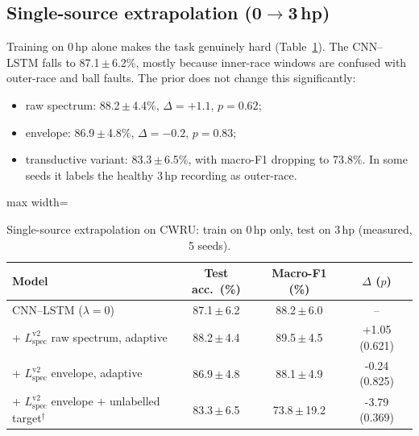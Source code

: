\documentclass[conference]{IEEEtran}
\begin{document}
\subsection{Single-source extrapolation (0$\to$3\,hp)}
Training on 0\,hp alone makes the task genuinely hard
(Table~\ref{tab:single}). The CNN--LSTM falls to 87.1\,$\pm$\,6.2\%, mostly
because inner-race windows are confused with outer-race and ball faults. The
prior does not change this significantly:
\begin{itemize}
\item raw spectrum: 88.2\,$\pm$\,4.4\%, $\Delta=+1.1$, $p=0.62$;
\item envelope: 86.9\,$\pm$\,4.8\%, $\Delta=-0.2$, $p=0.83$;
\item transductive variant: 83.3\,$\pm$\,6.5\%, with macro-F1 dropping to
73.8\%. In some seeds it labels the healthy 3\,hp recording as outer-race.
\end{itemize}

\begin{table}[t]
\caption{Single-source extrapolation on CWRU: train on 0\,hp only, test on 3\,hp (measured, 5 seeds).}
\label{tab:single}
\centering
\footnotesize
\begin{adjustbox}{max width=\columnwidth}
\begin{tabular}{lccc}
\toprule
Model & Test acc.\ (\%) & Macro-F1 (\%) & $\Delta$ ($p$) \\
\midrule
CNN--LSTM ($\lambda=0$) & 87.1\,$\pm$\,6.2 & 88.2\,$\pm$\,6.0 & -- \\
+ $L_{\mathrm{spec}}^{\mathrm{v2}}$ raw spectrum, adaptive & 88.2\,$\pm$\,4.4 & 89.5\,$\pm$\,4.5 & +1.05 (0.621) \\
+ $L_{\mathrm{spec}}^{\mathrm{v2}}$ envelope, adaptive & 86.9\,$\pm$\,4.8 & 88.1\,$\pm$\,4.9 & -0.24 (0.825) \\
+ $L_{\mathrm{spec}}^{\mathrm{v2}}$ envelope + unlabelled target$^{\dagger}$ & 83.3\,$\pm$\,6.5 & 73.8\,$\pm$\,19.2 & -3.79 (0.369) \\
\bottomrule
\end{tabular}
\end{adjustbox}
\end{table}
\end{document}
